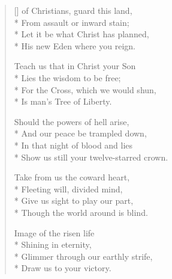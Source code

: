 \newHymn
{}
\label{hymn:HelpofChristians}

\begin{verse}[\versewidth]
 of Christians, guard this land,\\*
From assault or inward stain;\\*
Let it be what Christ has planned,\\*
His new Eden where you reign.

 Teach us that in Christ your Son\\*
Lies the wisdom to be free;\\*
For the Cross, which we would shun,\\*
Is man's Tree of Liberty.

 Should the powers of hell arise,\\*
And our peace be trampled down,\\*
In that night of blood and lies\\*
Show us still your twelve-starred crown.

 Take from us the coward heart,\\*
Fleeting will, divided mind,\\*
Give us sight to play our part,\\*
Though the world around is blind.

 Image of the risen life\\*
Shining in eternity,\\*
Glimmer through our earthly strife,\\*
Draw us to your victory.

\end{verse}



